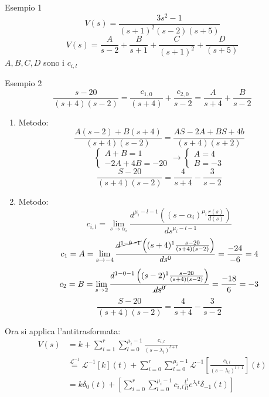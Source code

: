 \documentclass[a4paper]{article}
\theoremstyle{definition}
\theoremstyle{remark}
\begin{document}
\begin{examplebox}{Esempio 1}
    \[V(s) = \frac{3s^2 - 1}{(s+1)^2(s-2)(s+5)}\]
    \[V(s) = \frac{A}{s-2} + \frac{B}{s+1} + \frac{C}{(s+1)^2} + \frac{D}{(s+5)}\]
    $A, B, C, D$ sono i $c_{i,l}$
\end{examplebox}
\begin{examplebox}{Esempio 2}
    \[\frac{s-20}{(s+4)(s-2)} = \frac{c_{1,0}}{(s+4)} + \frac{c_{2,0}}{s-2} = \frac{A}{s+4} + \frac{B}{s-2}\]
    \begin{enumerate}
        \item Metodo: \[\frac{A(s-2)+B(s+4)}{(s+4)(s-2)} = \frac{AS - 2A + BS + 4b}{(s+4)(s+2)}\]
        \[\begin{cases}
            A + B = 1\\
            -2A + 4B = -20
        \end{cases} \rightarrow \begin{cases}
            A = 4\\
            B = -3
        \end{cases}\] 
        \[\frac{S - 20}{(s+4)(s-2)} = \frac{4}{s+4} - \frac{3}{s-2}\]
        \item Metodo: \[c_{i,l} = \lim_{s \rightarrow \alpha_i}\frac{d^{\mu_i-l-1}\left((s-\alpha_i)^{\mu_i}\frac{r(s)}{d(s)}\right)}{ds^{\mu_i-l-1}}\]
        \[c_1  =  A = \lim_{s \rightarrow -4} \frac{\cancel{d^{1-0-1}}\left((s+4)^{1}\frac{s-20}{(s+4)(s-2)}\right)}{ds^0} = \frac{-24}{-6}= 4\]
        \[c_2  =  B = \lim_{s \rightarrow 2} \frac{d^{1-0-1}\left((s-2)^{1}\frac{s-20}{(s+4)(s-2)}\right)}{\cancel{ds^0}} = \frac{-18}{6}= -3\]
        \[\frac{S - 20}{(s+4)(s-2)} = \frac{4}{s+4} - \frac{3}{s-2}\]
    \end{enumerate}
\end{examplebox}
\noindent
Ora si applica l'antitrasformata:
\begin{align*}
    V(s) &= k + \sum_{i=1}^r \sum_{l=0}^{\mu_i - 1}\frac{c_{i,l}}{(s-\lambda_i)^{l+1}}\\
    &\stackrel{\mathcal{L}^{-1}}{=} \mathcal{L}^{-1}[k](t) + \sum_{i=0}^{r}\sum_{l=0}^{\mu_i - 1} \mathcal{L}^{-1}\left[\frac{c_{i,l}}{(s-\lambda_i)^{l+1}}\right](t)\\
    &= k\delta_0(t) +  \left[\sum_{i=0}^{r}\sum_{l=0}^{\mu_i - 1} c_{i,l} \frac{t^l}{l!}e^{\lambda_i t}\delta_{-1}(t)\right]
\end{align*}
\end{document}
